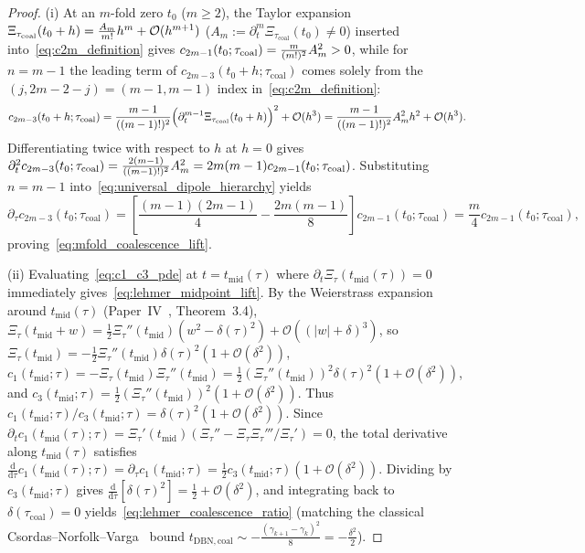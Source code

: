 \documentclass[11pt,reqno]{amsart}
\theoremstyle{definition}
\theoremstyle{remark}
\numberwithin{equation}{section}
\newcommand{\dd}{\mathrm{d}}
\newcommand{\fac}{\mathclose{\mathchar"0021}}
\begin{document}
\begin{proof}
(i) At an $m$-fold zero $t_0$ ($m \ge 2$), the Taylor expansion $\Xi_{\tau_{\mathrm{coal}}}(t_0 + h) = \frac{A_m}{m\fac}h^m + \mathcal{O}(h^{m+1})$ ($A_m := \partial_t^m\Xi_{\tau_{\mathrm{coal}}}(t_0) \neq 0$) inserted into~\eqref{eq:c2m_definition} gives $c_{2m-1}(t_0;\tau_{\mathrm{coal}}) = \frac{m}{(m\fac)^2}A_m^2 > 0$, while for $n = m-1$ the leading term of $c_{2m-3}(t_0+h;\tau_{\mathrm{coal}})$ comes solely from the $(j, 2m-2-j) = (m-1, m-1)$ index in~\eqref{eq:c2m_definition}:
\[
c_{2m-3}(t_0 + h; \tau_{\mathrm{coal}}) = \frac{m-1}{((m-1)\fac)^2}\Bigl(\partial_t^{m-1}\Xi_{\tau_{\mathrm{coal}}}(t_0+h)\Bigr)^2 + \mathcal{O}(h^3) = \frac{m-1}{((m-1)\fac)^2}A_m^2 h^2 + \mathcal{O}(h^3).
\]
Differentiating twice with respect to $h$ at $h = 0$ gives $\partial_t^2 c_{2m-3}(t_0;\tau_{\mathrm{coal}}) = \frac{2(m-1)}{((m-1)\fac)^2}A_m^2 = 2m(m-1)c_{2m-1}(t_0;\tau_{\mathrm{coal}})$. Substituting $n = m-1$ into~\eqref{eq:universal_dipole_hierarchy} yields
\[
\partial_\tau c_{2m-3}(t_0;\tau_{\mathrm{coal}}) = \left[\frac{(m-1)(2m-1)}{4} - \frac{2m(m-1)}{8}\right]c_{2m-1}(t_0;\tau_{\mathrm{coal}}) = \frac{m}{4}c_{2m-1}(t_0;\tau_{\mathrm{coal}}),
\]
proving~\eqref{eq:mfold_coalescence_lift}.

(ii) Evaluating~\eqref{eq:c1_c3_pde} at $t = t_{\mathrm{mid}}(\tau)$ where $\partial_t\Xi_\tau(t_{\mathrm{mid}}(\tau)) = 0$ immediately gives~\eqref{eq:lehmer_midpoint_lift}. By the Weierstrass expansion around $t_{\mathrm{mid}}(\tau)$ (Paper~IV~\cite{missiaen2026paper4}, Theorem~3.4), $\Xi_\tau(t_{\mathrm{mid}} + w) = \frac{1}{2}\Xi_\tau''(t_{\mathrm{mid}})(w^2 - \delta(\tau)^2) + \mathcal{O}((|w|+\delta)^3)$, so $\Xi_\tau(t_{\mathrm{mid}}) = -\frac{1}{2}\Xi_\tau''(t_{\mathrm{mid}})\delta(\tau)^2(1+\mathcal{O}(\delta^2))$, $c_1(t_{\mathrm{mid}};\tau) = -\Xi_\tau(t_{\mathrm{mid}})\Xi_\tau''(t_{\mathrm{mid}}) = \frac{1}{2}(\Xi_\tau''(t_{\mathrm{mid}}))^2\delta(\tau)^2(1+\mathcal{O}(\delta^2))$, and $c_3(t_{\mathrm{mid}};\tau) = \frac{1}{2}(\Xi_\tau''(t_{\mathrm{mid}}))^2(1+\mathcal{O}(\delta^2))$. Thus $c_1(t_{\mathrm{mid}};\tau)/c_3(t_{\mathrm{mid}};\tau) = \delta(\tau)^2(1+\mathcal{O}(\delta^2))$. Since $\partial_t c_1(t_{\mathrm{mid}}(\tau);\tau) = \Xi_\tau'(t_{\mathrm{mid}})(\Xi_\tau'' - \Xi_\tau\Xi_\tau'''/\Xi_\tau') = 0$, the total derivative along $t_{\mathrm{mid}}(\tau)$ satisfies $\frac{\dd}{\dd\tau}c_1(t_{\mathrm{mid}}(\tau);\tau) = \partial_\tau c_1(t_{\mathrm{mid}};\tau) = \frac{1}{2}c_3(t_{\mathrm{mid}};\tau)(1+\mathcal{O}(\delta^2))$. Dividing by $c_3(t_{\mathrm{mid}};\tau)$ gives $\frac{\dd}{\dd\tau}[\delta(\tau)^2] = \frac{1}{2} + \mathcal{O}(\delta^2)$, and integrating back to $\delta(\tau_{\mathrm{coal}}) = 0$ yields~\eqref{eq:lehmer_coalescence_ratio} (matching the classical Csordas--Norfolk--Varga~\cite{csordas1988,csordas1994} bound $t_{\mathrm{DBN,coal}} \sim -\frac{(\gamma_{k+1}-\gamma_k)^2}{8} = -\frac{\delta^2}{2}$).
\end{proof}
\end{document}
